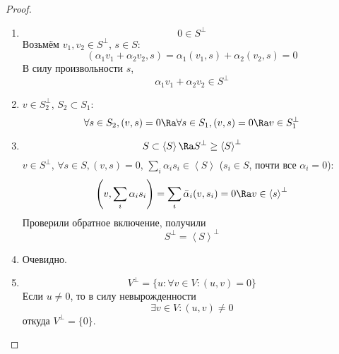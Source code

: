 \begin{proof}
	\begin{enumerate}
	\item
		\[ 0 \in S^\bot \]
		Возьмём $v_1, v_2 \in S^\bot$, $s \in S$:
		\[ (\alpha_1 v_1 + \alpha_2 v_2, s) = \alpha_1(v_1, s) + \alpha_2(v_2, s) = 0 \]
		В силу произвольности $s$,
		\[ \alpha_1 v_1 + \alpha_2 v_2 \in S^\bot \]

	\item
		$v \in S_2^\bot$, $S_2 \subset S_1$:
		\[
			\forall s \in S_2, (v, s) = 0
			\Ra \forall s \in S_1, (v, s) = 0
			\Ra v  \in S_1^\bot
		\]

	\item
		\[
			S \subset \left<S\right> \Ra S^\bot \ge \left<S\right>^\bot
		\]
		$v \in S^\bot$, $\forall s \in S, (v, s) = 0$,
		$\sum_i \alpha_i s_i \in \left<S\right>$ ($s_i \in S$, почти все $\alpha_i = 0$):
		\[
			\left(v, \sum_i \alpha_i s_i\right) = \sum_i \bar \alpha_i (v, s_i) = 0
			\Ra v \in \left<s\right>^\bot
		\]
		Проверили обратное включение, получили
		\[ S^\bot = \left<S\right>^\bot \]

	\item
		Очевидно.

	\item
		\[ V^\bot = \{u \colon \forall v \in V \colon (u, v) = 0\} \]
		Если $u \ne 0$, то в силу невырожденности
		\[ \exists v \in V \colon (u, v) \ne 0 \]
		откуда $V^\bot = \{0\}$.


\end{enumerate}
\end{proof}
